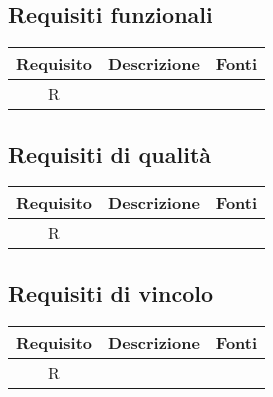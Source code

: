 \subsection{Requisiti funzionali}
\begin{center}
	\begin{longtable}{|c|c|c|}
		\hline
		\rowcolor{lighter-grayer}
		\textbf{Requisito} & \textbf{Descrizione} & \textbf{Fonti}  \\
		\hline
		\endfirsthead
		
		 R & & \\
		\hline
		
	\end{longtable}
\end{center}
\subsection{Requisiti di qualità}
\begin{center}
	\begin{longtable}{|c|c|c|}
		\hline
		\rowcolor{lighter-grayer}
		\textbf{Requisito} & \textbf{Descrizione} & \textbf{Fonti}  \\
		\hline
		\endfirsthead
		
		 R & & \\
		\hline
		
	\end{longtable}
\end{center}
\subsection{Requisiti di vincolo}
\begin{center}
	\begin{longtable}{|c|c|c|}
		\hline
		\rowcolor{lighter-grayer}
		\textbf{Requisito} & \textbf{Descrizione} & \textbf{Fonti}  \\
		\hline
		\endfirsthead
		
		 R & & \\
		\hline
		
	\end{longtable}
\end{center}
